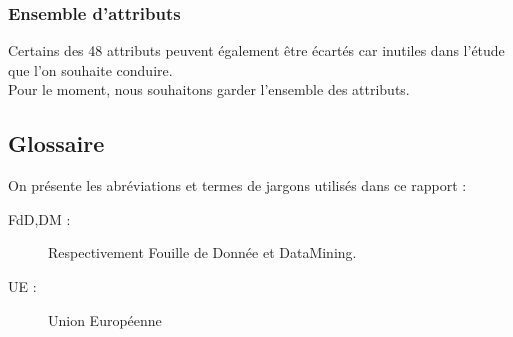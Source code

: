 \subsubsection{Ensemble d'attributs}
Certains des 48 attributs peuvent également être écartés car inutiles dans
l'étude que l'on souhaite conduire.\\
Pour le moment, nous souhaitons garder l'ensemble des attributs.


\subsection{Glossaire}

On présente les abréviations et termes de jargons utilisés dans ce rapport
:

\begin{description}
\item[FdD,DM : ] Respectivement Fouille de Donnée et DataMining.
\item[UE : ] Union Européenne
\end{description}
